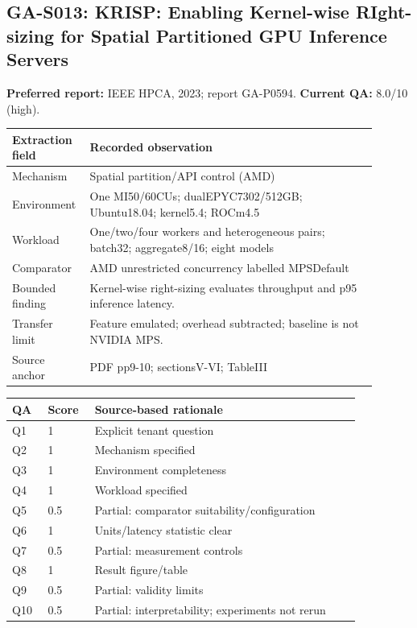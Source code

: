 \subsection{GA-S013: KRISP: Enabling Kernel-wise RIght-sizing for Spatial Partitioned GPU Inference Servers}
\textbf{Preferred report:} IEEE HPCA, 2023; report GA-P0594. \textbf{Current QA:} 8.0/10 (high).
\begin{longtable}{P{0.15\linewidth}P{0.75\linewidth}}
\toprule Extraction field & Recorded observation\\\midrule\endhead
Mechanism & Spatial partition/API control (AMD)\\
Environment & One MI50/60CUs; dualEPYC7302/512GB; Ubuntu18.04; kernel5.4; ROCm4.5\\
Workload & One/two/four workers and heterogeneous pairs; batch32; aggregate8/16; eight models\\
Comparator & AMD unrestricted concurrency labelled MPSDefault\\
Bounded finding & Kernel-wise right-sizing evaluates throughput and p95 inference latency.\\
Transfer limit & Feature emulated; overhead subtracted; baseline is not NVIDIA MPS.\\
Source anchor & PDF pp9-10; sectionsV-VI; TableIII\\
\bottomrule\end{longtable}
\begin{longtable}{P{0.09\linewidth}P{0.10\linewidth}P{0.67\linewidth}}
\toprule QA & Score & Source-based rationale\\\midrule\endhead
Q1 & 1 & Explicit tenant question\\
Q2 & 1 & Mechanism specified\\
Q3 & 1 & Environment completeness\\
Q4 & 1 & Workload specified\\
Q5 & 0.5 & Partial: comparator suitability/configuration\\
Q6 & 1 & Units/latency statistic clear\\
Q7 & 0.5 & Partial: measurement controls\\
Q8 & 1 & Result figure/table\\
Q9 & 0.5 & Partial: validity limits\\
Q10 & 0.5 & Partial: interpretability; experiments not rerun\\
\bottomrule\end{longtable}


